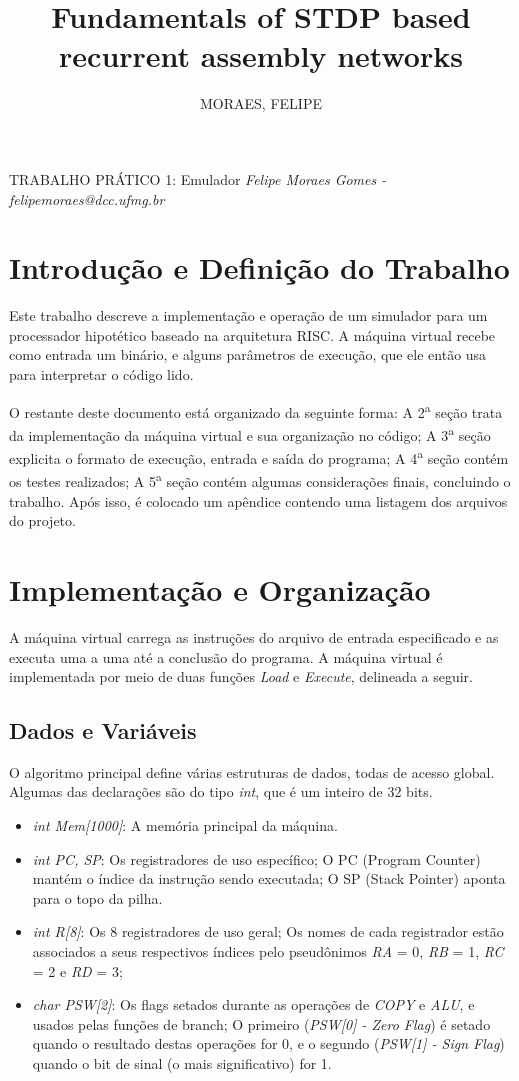 \documentclass[12pt, a4paper]{article}
\author{MORAES, FELIPE}
\title{Fundamentals of STDP based recurrent assembly networks}
\begin{document}
\begin{center}
{\huge TRABALHO PRÁTICO 1: Emulador}
\textit{Felipe Moraes Gomes - felipemoraes@dcc.ufmg.br}
\end{center}
\section{Introdução e Definição do Trabalho}
Este trabalho descreve a implementação e operação de um simulador para um processador hipotético baseado na arquitetura RISC. A máquina virtual recebe como entrada um binário, e alguns parâmetros de execução, que ele então usa para interpretar o código lido.

O restante deste documento está organizado da seguinte forma: A 2\textsuperscript{a} seção trata da implementação da máquina virtual e sua organização no código; A 3\textsuperscript{a} seção explicita o formato de execução, entrada e saída do programa; A 4\textsuperscript{a} seção contém os testes realizados; A 5\textsuperscript{a} seção contém algumas considerações finais, concluindo o trabalho. Após isso, é colocado um apêndice contendo uma listagem dos arquivos do projeto. 

\section{Implementação e Organização}

A máquina virtual carrega as instruções do arquivo de entrada especificado e as executa uma a uma até a conclusão do programa. A máquina virtual é implementada por meio de duas funções \emph{Load} e \emph{Execute}, delineada a seguir.

\subsection{Dados e Variáveis}

O algoritmo principal define várias estruturas de dados, todas de acesso global. Algumas das declarações são do tipo \emph{int}, que é um inteiro de 32 bits.

\begin{itemize}
\item \emph{int Mem[1000]}: A memória principal da máquina.
\item \emph{int PC, SP}: Os registradores de uso específico; O PC (Program Counter) mantém o índice da instrução sendo executada; O SP (Stack Pointer) aponta para o topo da pilha. 
\item \emph{int R[8]}: Os 8 registradores de uso geral; Os nomes de cada registrador estão associados a seus respectivos índices pelo pseudônimos \emph{RA} = 0, \emph{RB} = 1, \emph{RC} = 2 e \emph{RD} = 3;
\item \emph{char PSW[2]}: Os flags setados durante as operações de \emph{COPY} e \emph{ALU}, e usados pelas funções de branch; O primeiro (\emph{PSW[0] - Zero Flag}) é setado quando o resultado destas operações for 0, e o segundo (\emph{PSW[1] - Sign Flag}) quando o bit de sinal (o mais significativo) for 1.
\end{itemize}
\end{document}

